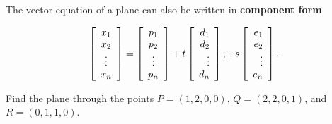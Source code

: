 \documentclass{ximera}
\begin{document}
The vector equation of a plane can also be written in
\textbf{component form}

\begin{equation*}
  \startmat{c} x_1 \\ x_2 \\ \vdots \\ x_n \stopmat
  = \startmat{c} p_1 \\ p_2 \\ \vdots \\ p_n \stopmat
  + t \startmat{r} d_1 \\ d_2 \\ \vdots \\ d_n \stopmat,
  + s \startmat{r} e_1 \\ e_2 \\ \vdots \\ e_n \stopmat.
\end{equation*}

\begin{example}\label{ex:plane-from-three-points}
  Find the plane through the
  points $P = (1,2,0,0)$, $Q = (2,2,0,1)$, and $R = (0,1,1,0)$.
\end{example}
\end{document}
